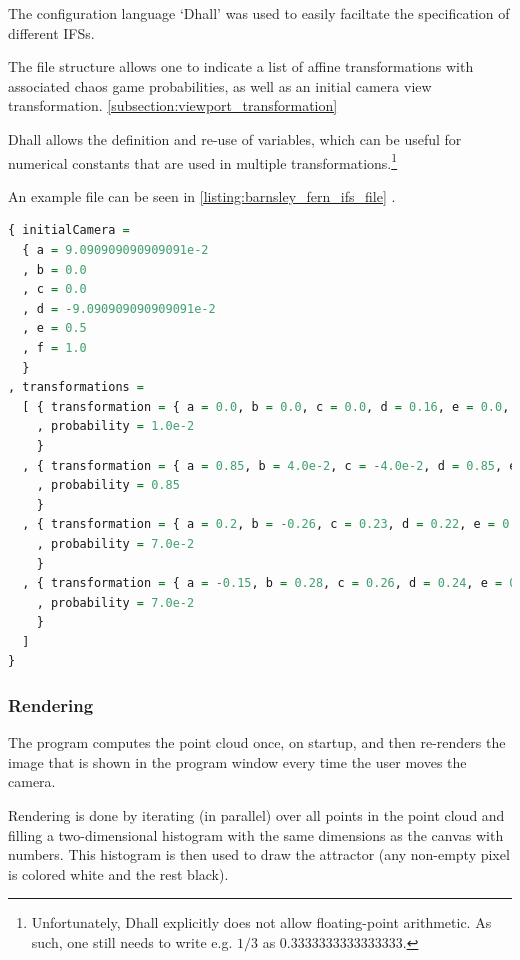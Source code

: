 \documentclass[11pt]{article}
\begin{document}
The configuration language `Dhall' \cite{gonzalez2019} was used to 
easily faciltate the specification of different IFSs.

The file structure allows one to indicate a list of affine transformations with associated chaos game probabilities,
as well as an initial camera view transformation. \autoref{subsection:viewport_transformation}

Dhall allows the definition and re-use of variables, which can be useful
for numerical constants that are used in multiple transformations.\footnote{Unfortunately, Dhall explicitly does not allow floating-point arithmetic.
As such, one still needs to write e.g. \(1/3\) as \(0.3333333333333333\).}

An example file can be seen in \autoref{listing:barnsley_fern_ifs_file} .


\begin{lstlisting}[float, language=Haskell, frame=single, breaklines=true, basicstyle=\scriptsize\tt, captionpos=b, caption={barnsley\_fern.ifs, representing \autoref{ifs:barnsley_fern}}, label={listing:barnsley_fern_ifs_file}]
{ initialCamera =
  { a = 9.090909090909091e-2
  , b = 0.0
  , c = 0.0
  , d = -9.090909090909091e-2
  , e = 0.5
  , f = 1.0
  }
, transformations =
  [ { transformation = { a = 0.0, b = 0.0, c = 0.0, d = 0.16, e = 0.0, f = 0.0 }
    , probability = 1.0e-2
    }
  , { transformation = { a = 0.85, b = 4.0e-2, c = -4.0e-2, d = 0.85, e = 0.0, f = 1.6 }
    , probability = 0.85
    }
  , { transformation = { a = 0.2, b = -0.26, c = 0.23, d = 0.22, e = 0.0, f = 1.6 }
    , probability = 7.0e-2
    }
  , { transformation = { a = -0.15, b = 0.28, c = 0.26, d = 0.24, e = 0.0, f = 0.44 }
    , probability = 7.0e-2
    }
  ]
}

\end{lstlisting}

\subsubsection{Rendering}
\label{sec:org392da5d}
The program computes the point cloud once, on startup, and then re-renders the image that is shown in the program window
every time the user moves the camera.

Rendering is done by iterating (in parallel) over all points in the point cloud and filling a two-dimensional histogram with the same dimensions
as the canvas with numbers. 
This histogram is then used to draw the attractor (any non-empty pixel is colored white and the rest black).
\end{document}
